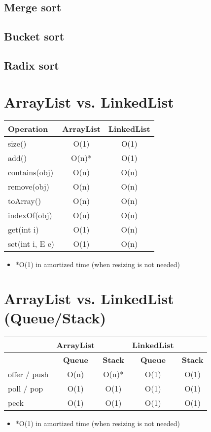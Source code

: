 \documentclass{article}
\begin{document}
\subsection{Merge sort}

\subsection{Bucket sort}
\subsection{Radix sort}

\section{ArrayList vs. LinkedList}
\begin{table}[h!]
\centering
\begin{tabular}{|l|c|c|}
\hline
\textbf{Operation} & \textbf{ArrayList} & \textbf{LinkedList} \\
\hline
size() & O(1) & O(1) \\
\hline
add() & O(n)* & O(1) \\
\hline
contains(obj) & O(n) & O(n) \\
\hline
remove(obj) & O(n) & O(n) \\
\hline
toArray() & O(n) & O(n) \\
\hline
indexOf(obj) & O(n) & O(n) \\
\hline
get(int i) & O(1) & O(n) \\
\hline
set(int i, E e) & O(1) & O(n) \\
\hline
\end{tabular}
\end{table}
\begin{itemize}
  \item *O(1) in amortized time (when resizing is not needed)
\end{itemize}


\section{ArrayList vs. LinkedList (Queue/Stack)}
\begin{table}[h!]
\centering
\begin{tabular}{|l|c|c|c|c|}
\hline
& \textbf{ArrayList} & & \textbf{LinkedList} & \\
\hline
& \textbf{Queue} & \textbf{Stack} & \textbf{Queue} & \textbf{Stack} \\
\hline
offer / push & O(n) & O(n)* & O(1) & O(1) \\
\hline
poll / pop & O(1) & O(1) & O(1) & O(1) \\
\hline
peek & O(1) & O(1) & O(1) & O(1) \\
\hline
\end{tabular}
\end{table}
\begin{itemize}
  \item *O(1) in amortized time (when resizing is not needed)
\end{itemize}
\end{document}
